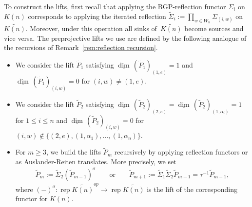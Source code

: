 \documentclass[smallextended,envcountsect,envcountsame]{svjour3}
\numberwithin{equation}{section}
\newcommand\udim{{\underline{\dim}\, }}
\newcommand{\rep}{\operatorname{rep}}
\begin{document}
To construct the lifts, first recall that applying the BGP-reflection functor $\Sigma_i$ on $K(n)$ corresponds to applying the iterated reflection $\tilde\Sigma_i:=\prod_{w\in W_n}\Sigma_{(i,w)}$ on $\widetilde{K(n)}$.
Moreover, under this operation all sinks of~$\widetilde{K(n)}$ become sources and vice versa.
The preprojective lifts we use are defined by the following analogue of the recursions of Remark~\ref{rem:reflection recursion}.
\begin{itemize}
  \item We consider the lift $\tilde P_1$ satisfying $\udim(\tilde P_1)_{(1,e)}=1$ and $\udim(\tilde P_1)_{(i,w)}=0$ for $(i,w)\neq (1,e)$.
  \item We consider the lift $\tilde P_2$ satisfying $\udim(\tilde P_2)_{(2,e)}=\udim(\tilde P_2)_{(1,\alpha_i)}=1$ for $1\le i\le n$ and $\udim(\tilde P_2)_{(i,w)}=0$ for $(i,w)\notin\{(2,e),(1,\alpha_1),\ldots,(1,\alpha_n)\}$.
  \item For $m\geq 3$, we build the lifts $\tilde P_m$ recursively by applying reflection functors or as Auslander-Reiten translates.
    More precisely, we set
    \begin{align}
      \label{eq:recursive covers}
      \tilde P_m:=\tilde\Sigma_2(\tilde P_{m-1})^{\sigma}\qquad\text{or}\qquad\tilde P_{m+1}:=\tilde\Sigma_{1}\tilde\Sigma_2\tilde P_{m-1}=\tau^{-1} \tilde P_{m-1},
    \end{align}
    where $(-)^\sigma:\rep\widetilde{K(n)}^{op}\to\rep\widetilde{K(n)}$ is the lift of the corresponding functor for $K(n)$.
\end{itemize}
\end{document}
